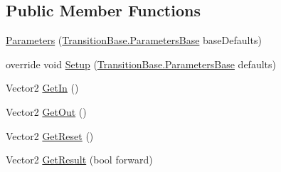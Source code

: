 \subsection*{Public Member Functions}
\begin{DoxyCompactItemize}
\item 
\hyperlink{class_unity_engine_1_1_u_i_1_1_windows_1_1_animations_1_1_window_animation_transition_slide_1_1_parameters_af9485eb5cbd7ba3cc7a08988ba60f187}{Parameters} (\hyperlink{class_unity_engine_1_1_u_i_1_1_windows_1_1_animations_1_1_transition_base_1_1_parameters_base}{Transition\+Base.\+Parameters\+Base} base\+Defaults)
\item 
override void \hyperlink{class_unity_engine_1_1_u_i_1_1_windows_1_1_animations_1_1_window_animation_transition_slide_1_1_parameters_a71f8a5803f2ea207fe5e33f9c53096da}{Setup} (\hyperlink{class_unity_engine_1_1_u_i_1_1_windows_1_1_animations_1_1_transition_base_1_1_parameters_base}{Transition\+Base.\+Parameters\+Base} defaults)
\item 
Vector2 \hyperlink{class_unity_engine_1_1_u_i_1_1_windows_1_1_animations_1_1_window_animation_transition_slide_1_1_parameters_aef6ab82329e7fdd0af5854fce86d327c}{Get\+In} ()
\item 
Vector2 \hyperlink{class_unity_engine_1_1_u_i_1_1_windows_1_1_animations_1_1_window_animation_transition_slide_1_1_parameters_aa74d123d3f899b6720e2bd4d5aa13e4f}{Get\+Out} ()
\item 
Vector2 \hyperlink{class_unity_engine_1_1_u_i_1_1_windows_1_1_animations_1_1_window_animation_transition_slide_1_1_parameters_a753770473bbf71d70c44e7167c3f8663}{Get\+Reset} ()
\item 
Vector2 \hyperlink{class_unity_engine_1_1_u_i_1_1_windows_1_1_animations_1_1_window_animation_transition_slide_1_1_parameters_a319c08ce8ef417f6c1ab1aca63885163}{Get\+Result} (bool forward)
\end{DoxyCompactItemize}
